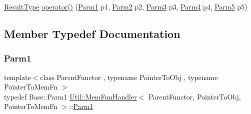 \begin{DoxyCompactItemize}
\item 
\mbox{\hyperlink{classUtil_1_1MemFunHandler_a093690dcced95ad48c5429e50006c83e}{Result\+Type}} \mbox{\hyperlink{classUtil_1_1MemFunHandler_a8746a13d5fa1e938573fe80b10d84b91}{operator()}} (\mbox{\hyperlink{classUtil_1_1MemFunHandler_a43182733677fc623d89e5613ecf15761}{Parm1}} p1, \mbox{\hyperlink{classUtil_1_1MemFunHandler_a9d454c62047cb4bff3173b5bda9a38c8}{Parm2}} p2, \mbox{\hyperlink{classUtil_1_1MemFunHandler_a6cbef94d16f4d6b29d6a8a90afbeff4f}{Parm3}} p3, \mbox{\hyperlink{classUtil_1_1MemFunHandler_a1e5a0cf582f3b540e409d333ae06a4bd}{Parm4}} p4, \mbox{\hyperlink{classUtil_1_1MemFunHandler_a70d588c17500255eb899788aa0e6c29d}{Parm5}} p5)
\end{DoxyCompactItemize}


\subsection{Member Typedef Documentation}
\mbox{\label{classUtil_1_1MemFunHandler_a43182733677fc623d89e5613ecf15761}} 
\subsubsection{\texorpdfstring{Parm1}{Parm1}\hspace{0.1cm}{\footnotesize\ttfamily [1/3]}}
{\footnotesize\ttfamily template$<$class Parent\+Functor , typename Pointer\+To\+Obj , typename Pointer\+To\+Mem\+Fn $>$ \\
typedef Base\+::\+Parm1 \mbox{\hyperlink{classUtil_1_1MemFunHandler}{Util\+::\+Mem\+Fun\+Handler}}$<$ Parent\+Functor, Pointer\+To\+Obj, Pointer\+To\+Mem\+Fn $>$\+::\mbox{\hyperlink{classUtil_1_1MemFunHandler_a43182733677fc623d89e5613ecf15761}{Parm1}}}

\mbox{\label{classUtil_1_1MemFunHandler_a43182733677fc623d89e5613ecf15761}} 
